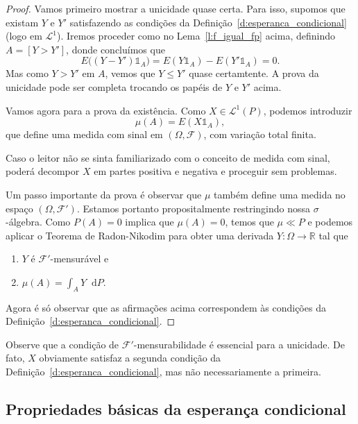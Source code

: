 \documentclass[reqno]{article}
\newcommand*\1{\mathds{1}}
\renewcommand*\d{\mathop{}\!\mathrm{d}}
\begin{document}
\begin{proof}
  Vamos primeiro mostrar a unicidade quase certa.
  Para isso, supomos que existam $Y$ e $Y'$ satisfazendo as condições da Definição~\ref{d:esperanca_condicional} (logo em $\mathcal{L}^1$).
  Iremos proceder como no Lema~\ref{l:f_igual_fp} acima, definindo $A = [Y > Y']$, donde concluímos que
  \begin{equation}
    E\big( (Y - Y')\1_{A} \big) = E(Y \1_{A}) - E(Y' \1_{A}) = 0.
  \end{equation}
  Mas como $Y > Y'$ em $A$, vemos que $Y \leq Y'$ quase certamtente.
  A prova da unicidade pode ser completa trocando os papéis de $Y$ e $Y'$ acima.

  Vamos agora para a prova da existência.
  Como $X \in \mathcal{L}^1(P)$, podemos introduzir
  \begin{equation}
    \mu(A) = E(X \1_{A}),
  \end{equation}
  que define uma medida com sinal em $(\Omega, \mathcal{F})$, com variação total finita.

  Caso o leitor não se sinta familiarizado com o conceito de medida com sinal, poderá decompor $X$ em partes positiva e negativa e proceguir sem problemas.

  Um passo importante da prova é observar que $\mu$ também define uma medida no espaço $(\Omega, \mathcal{F}')$.
  Estamos portanto propositalmente restringindo nossa $\sigma$-álgebra.
  Como $P(A) = 0$ implica que $\mu(A) = 0$, temos que $\mu \ll P$ e podemos aplicar o Teorema de Radon-Nikodim para obter uma derivada $Y:\Omega \to \mathbb{R}$ tal que
  \begin{enumerate}
  \item $Y$ é $\mathcal{F}'$-mensurável e
  \item $\mu(A) = \int_A Y \d P$.
  \end{enumerate}
  Agora é só observar que as afirmações acima correspondem às condições da Definição~\ref{d:esperanca_condicional}.
\end{proof}


Observe que a condição de $\mathcal{F}'$-mensurabilidade é essencial para a unicidade.
De fato, $X$ obviamente satisfaz a segunda condição da Definição~\ref{d:esperanca_condicional}, mas não necessariamente a primeira.


\subsection{Propriedades básicas da esperança condicional}
\end{document}
